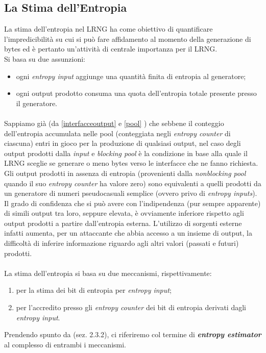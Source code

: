 \documentclass{article}
\begin{document}
 \subsection{La Stima dell'Entropia}\label{stima}
La stima dell'entropia nel LRNG ha come obiettivo di quantificare
l'impredicibilità su cui si può fare affidamento al momento della generazione
di bytes ed è pertanto un'attività di centrale importanza per il LRNG. \\
Si basa su due assunzioni: 
\begin{itemize}
  \item ogni \emph{entropy input} aggiunge una quantità finita di entropia al
  generatore;
  \item ogni output prodotto consuma una quota dell'entropia totale presente
  presso il generatore.
\end{itemize}  
\paragraph{} Sappiamo già (da \ref{interfacceoutput} e \ref{pool} ) che sebbene
il conteggio dell'entropia accumulata nelle pool (conteggiata negli
\emph{entropy counter} di ciascuna) entri in gioco per la produzione di
qualsiasi output, nel caso degli output prodotti dalla \emph{input} e
\emph{blocking pool} è la condizione in base alla quale il LRNG sceglie se
generare o meno bytes verso le interfacce che ne fanno richiesta. \newline Gli
output prodotti in assenza di entropia (provenienti dalla \emph{nonblocking
pool} quando il suo \emph{entropy counter} ha valore zero) sono equivalenti
a quelli prodotti da un generatore di numeri pseudocasuali semplice (ovvero
privo di \emph{entropy inputs}).
Il grado di confidenza che si può avere con l'indipendenza (pur sempre
apparente) di simili output tra loro, seppure elevata, è ovviamente inferiore
rispetto agli output prodotti a partire dall'entropia esterna.
L'utilizzo di sorgenti esterne infatti aumenta, per un attaccante
che abbia accesso a un insieme di output, la difficoltà di inferire informazione
riguardo agli altri valori (passati e futuri) prodotti.
\paragraph{} La stima dell'entropia si basa su due meccanismi, rispettivamente:
\begin{enumerate}
  \item per la stima dei bit di entropia per \emph{entropy input};
  \item per l'accredito presso gli \emph{entropy counter} dei bit di entropia 
  derivati dagli \emph{entropy input}.
\end{enumerate}
Prendendo spunto da \cite{lach} (sez. 2.3.2), ci riferiremo col termine di
\textbf{\emph{entropy estimator}} al complesso di entrambi i meccanismi.
\end{document}
